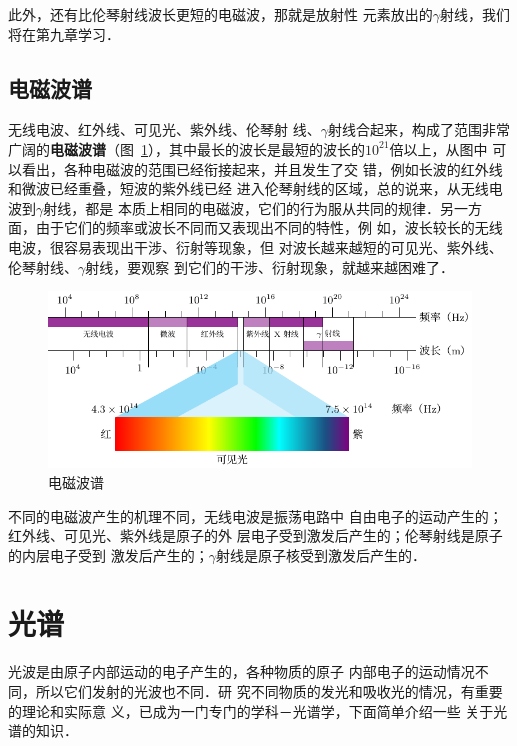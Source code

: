 此外，还有比伦琴射线波长更短的电磁波，那就是放射性
元素放出的$\gamma$射线，我们将在第九章学习．

\subsection{电磁波谱}

无线电波、红外线、可见光、紫外线、伦琴射
线、$\gamma$射线合起来，构成了范围非常广阔的\textbf{电磁波谱}（图~\ref{fig_C_6-17}），其中最长的波长是最短的波长的$10^{21}$倍以上，从图中
可以看出，各种电磁波的范围已经衔接起来，并且发生了交
错，例如长波的红外线和微波已经重叠，短波的紫外线已经
进入伦琴射线的区域，总的说来，从无线电波到$\gamma$射线，都是
本质上相同的电磁波，它们的行为服从共同的规律．另一方
面，由于它们的频率或波长不同而又表现出不同的特性，例
如，波长较长的无线电波，很容易表现出干涉、衍射等现象，但
对波长越来越短的可见光、紫外线、伦琴射线、$\gamma$射线，要观察
到它们的干涉、衍射现象，就越来越困难了．

\begin{figure}[htbp]
    \centering
    \includegraphics{fig/C/6-17.pdf}
    \caption{电磁波谱}\label{fig_C_6-17}
\end{figure}

不同的电磁波产生的机理不同，无线电波是振荡电路中
自由电子的运动产生的；红外线、可见光、紫外线是原子的外
层电子受到激发后产生的；伦琴射线是原子的内层电子受到
激发后产生的；$\gamma$射线是原子核受到激发后产生的．

\section{光谱}
光波是由原子内部运动的电子产生的，各种物质的原子
内部电子的运动情况不同，所以它们发射的光波也不同．研
究不同物质的发光和吸收光的情况，有重要的理论和实际意
义，已成为一门专门的学科－光谱学，下面简单介绍一些
关于光谱的知识．

